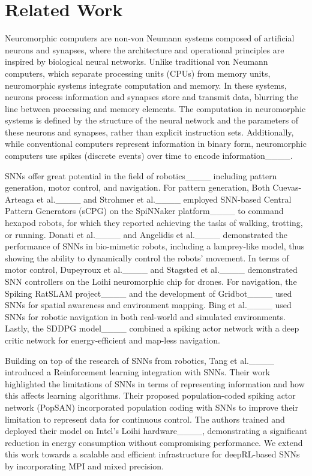 \section{Related Work}
Neuromorphic computers are non-von Neumann systems composed of artificial neurons and synapses, where the architecture and operational principles are inspired by biological neural networks. Unlike traditional von Neumann computers, which separate processing units (CPUs) from memory units, neuromorphic systems integrate computation and memory. In these systems, neurons process information and synapses store and transmit data, blurring the line between processing and memory elements. The computation in neuromorphic systems is defined by the structure of the neural network and the parameters of these neurons and synapses, rather than explicit instruction sets. Additionally, while conventional computers represent information in binary form, neuromorphic computers use spikes (discrete events) over time to encode information____.

SNNs offer great potential in the field of robotics____
including pattern generation, motor control, and navigation. For pattern
generation, Both Cuevas-Arteaga et al.____ and Strohmer et
al.____ employed SNN-based Central Pattern Generators (sCPG) on
the SpiNNaker platform____ to command hexapod robots, for which
they reported achieving the tasks of walking, trotting, or running.
Donati et al.____ and Angelidis et
al.____ demonstrated the performance of SNNs in bio-mimetic
robots, including a lamprey-like model, thus showing the ability to
dynamically control the robots' movement. In terms of motor control,
Dupeyroux et al.____ and Stagsted et al.____ demonstrated
SNN controllers on the Loihi neuromorphic chip for drones. For
navigation, the Spiking RatSLAM project____ and the development of
Gridbot____ used SNNs for spatial awareness and environment
mapping. Bing et al.____ used SNNs for robotic navigation in both
real-world and simulated environments. Lastly, the SDDPG
model____ combined a spiking actor network with a deep critic
network for energy-efficient and map-less navigation.

Building on top of the research of SNNs from robotics, Tang et al.____ introduced a Reinforcement learning integration with SNNs. Their work highlighted the limitations of SNNs in terms of representing information and how this affects learning algorithms. Their proposed population-coded spiking actor network
(PopSAN) incorporated population coding with SNNs to improve their
limitation to represent data for continuous control.
The authors trained and deployed their model on Intel's Loihi
hardware____, demonstrating a significant reduction in energy
consumption without compromising performance. We extend this work
towards a scalable and efficient infrastructure for deepRL-based SNNs by incorporating MPI and mixed precision.

